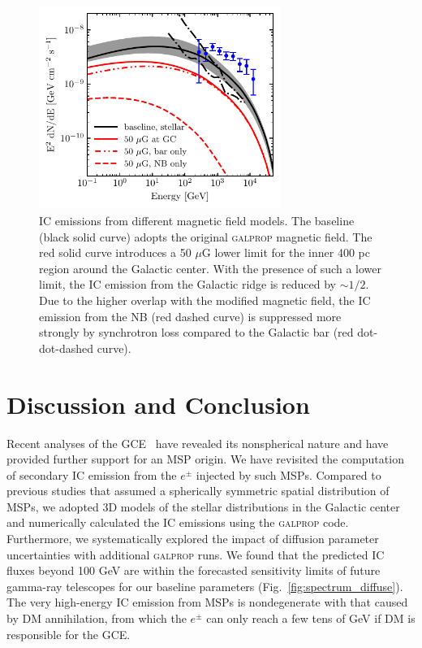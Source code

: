 \documentclass[doublespace,nopageskip]{VTthesis} %
\begin{document}
\begin{figure}[htb]
    \centering
    \includegraphics[width=0.7\textwidth]{Figures/IC_MSPs/ics_spectrum_bfields.pdf}
    \caption{IC emissions from different magnetic field models. The baseline (black solid curve) adopts the original \textsc{galprop} magnetic field. The red solid curve introduces a 50 $\mu$G lower limit for the inner 400 pc region around the Galactic center. With the presence of such a lower limit, the IC emission from the Galactic ridge is reduced by $\sim 1/2$. Due to the higher overlap with the modified magnetic field, the IC emission from the NB (red dashed curve) is suppressed more strongly by synchrotron loss compared to the Galactic bar (red dot-dot-dashed curve).}
    \label{fig:spectrum_bfields}
\end{figure}

\section{\label{sec:conclu}Discussion and Conclusion}

Recent analyses of the GCE~\cite{2018NatAs...2..387M,2018NatAs...2..819B,2019JCAP...09..042M} have revealed its nonspherical nature and have provided further support for an MSP origin. We have revisited the computation of secondary IC emission from the $e^\pm$ injected by such MSPs. Compared to previous studies that assumed a spherically symmetric spatial distribution of MSPs, we adopted 3D models of the stellar distributions in the Galactic center and numerically calculated the IC emissions using the \textsc{galprop} code. Furthermore, we systematically explored the impact of diffusion parameter uncertainties with additional \textsc{galprop} runs. We found that the predicted IC fluxes beyond 100 GeV are within the forecasted sensitivity limits of future gamma-ray telescopes for our baseline parameters (Fig.~\ref{fig:spectrum_diffuse}). The very high-energy IC emission from MSPs is nondegenerate with that caused by DM annihilation, from which the $e^\pm$ can only reach a few tens of GeV if DM is responsible for the GCE.
\end{document}
